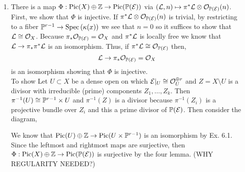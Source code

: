 \documentclass[12pt]{article}
\begin{document}
\begin{enumerate}
\item There is a map $\Phi : \Pic{X} \oplus \Z \to \Pic{\P(\E)}$ via $(\L, n) \mapsto \pi^* \L \otimes \struct{\P(\E)}(n)$. First, we show that $\Phi$ is injective. If $\pi^* \L \otimes \struct{\P(\E)}(n)$ is trivial, by restricting to a fiber $\P^{r-1} \to \Spec{\kappa(x)}$ we see that $n = 0$ so it suffices to show that $\L \cong \struct{X}$. Because $\pi_* \struct{\P(\E)} = \struct{X}$ and $\pi^* \L$ is locally free we know that $\L \to \pi_* \pi^* \L$ is an isomorphism. Thus, if $\pi^* \L \cong \struct{\P(\E)}$ then,
\[ \L \to \pi_* \struct{\P(\E)} = \struct{X} \]
is an isomorphism showing that $\Phi$ is injective. 
\bigskip\\
To show 
Let $U \subset X$ be a dense open on which $\E|_U \cong \struct{U}^{\oplus r}$ and $Z = X \setminus U$ is a divisor with irreducible (prime) components $Z_1, \dots, Z_k$. Then $\pi^{-1}(U) \cong \P^{r-1} \times U$ and $\pi^{-1}(Z)$ is a divisor because $\pi^{-1}(Z_i)$ is a projective bundle over $Z_i$ and this a prime divisor of $\P(\E)$. Then consider the diagram,
\begin{center}
\end{center}
We know that $\Pic{U} \oplus \Z \to \Pic{U \times \P^{r-1}}$ is an isomorphism by Ex. 6.1. Since the leftmost and rightmost maps are surjective, then $\Phi : \Pic{X} \oplus \Z \to \Pic{\P(\E)}$ is surjective by the four lemma. (WHY REGULARITY NEEDED?)


\end{enumerate}
\end{document}

